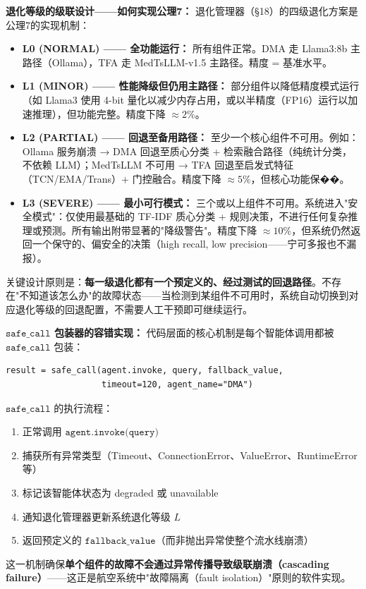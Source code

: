 \documentclass[11pt,a4paper]{ctexart}
\theoremstyle{remark}
\begin{document}
\textbf{退化等级的级联设计——如何实现公理7：} 退化管理器（§18）的四级退化方案是公理7的实现机制：
\begin{itemize}[nosep]
\item \textbf{L0 (NORMAL) —— 全功能运行：} 所有组件正常。DMA 走 Llama3:8b 主路径（Ollama），TFA 走 MedTsLLM-v1.5 主路径。精度 = 基准水平。
\item \textbf{L1 (MINOR) —— 性能降级但仍用主路径：} 部分组件以降低精度模式运行（如 Llama3 使用 4-bit 量化以减少内存占用，或以半精度（FP16）运行以加速推理），但功能完整。精度下降 $\approx 2\%$。
\item \textbf{L2 (PARTIAL) —— 回退至备用路径：} 至少一个核心组件不可用。例如：Ollama 服务崩溃 → DMA 回退至质心分类 + 检索融合路径（纯统计分类，不依赖 LLM）；MedTsLLM 不可用 → TFA 回退至启发式特征（TCN/EMA/Trans）+ 门控融合。精度下降 $\approx 5\%$，但核心功能保��。
\item \textbf{L3 (SEVERE) —— 最小可行模式：} 三个或以上组件不可用。系统进入"安全模式"：仅使用最基础的 TF-IDF 质心分类 + 规则决策，不进行任何复杂推理或预测。所有输出附带显著的"降级警告"。精度下降 $\approx 10\%$，但系统仍然返回一个保守的、偏安全的决策（high recall, low precision——宁可多报也不漏报）。
\end{itemize}
关键设计原则是：\textbf{每一级退化都有一个预定义的、经过测试的回退路径}。不存在"不知道该怎么办"的故障状态——当检测到某组件不可用时，系统自动切换到对应退化等级的回退配置，不需要人工干预即可继续运行。

\textbf{$\mathtt{safe\_call}$ 包装器的容错实现：} 代码层面的核心机制是每个智能体调用都被 $\mathtt{safe\_call}$ 包装：
\begin{verbatim}
result = safe_call(agent.invoke, query, fallback_value,
                   timeout=120, agent_name="DMA")
\end{verbatim}
$\mathtt{safe\_call}$ 的执行流程：
\begin{enumerate}[nosep]
\item 正常调用 $\texttt{agent.invoke(query)}$
\item 捕获所有异常类型（Timeout、ConnectionError、ValueError、RuntimeError 等）
\item 标记该智能体状态为 degraded 或 unavailable
\item 通知退化管理器更新系统退化等级 $L$
\item 返回预定义的 $\texttt{fallback\_value}$（而非抛出异常使整个流水线崩溃）
\end{enumerate}
这一机制确保\textbf{单个组件的故障不会通过异常传播导致级联崩溃（cascading failure）}——这正是航空系统中"故障隔离（fault isolation）"原则的软件实现。
\end{document}
